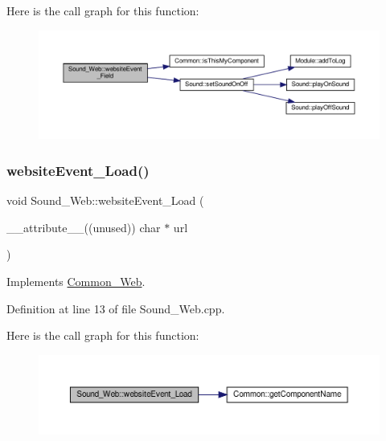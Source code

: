 Here is the call graph for this function\+:
\nopagebreak
\begin{figure}[H]
\begin{center}
\leavevmode
\includegraphics[width=350pt]{class_sound___web_a3f9b60318e13f510c7ed49cc52962424_cgraph}
\end{center}
\end{figure}
\mbox{\label{class_sound___web_ae3a500bbde7e1264aeeb1bf43b5ba09f}} 
\subsubsection{\texorpdfstring{website\+Event\+\_\+\+Load()}{websiteEvent\_Load()}}
{\footnotesize\ttfamily void Sound\+\_\+\+Web\+::website\+Event\+\_\+\+Load (\begin{DoxyParamCaption}\item[{\+\_\+\+\_\+attribute\+\_\+\+\_\+((unused)) char $\ast$}]{url }\end{DoxyParamCaption})\hspace{0.3cm}{\ttfamily [virtual]}}



Implements \hyperlink{class_common___web_a5ce0d5ce6f63279c3b624371d8a76211}{Common\+\_\+\+Web}.



Definition at line 13 of file Sound\+\_\+\+Web.\+cpp.

Here is the call graph for this function\+:
\nopagebreak
\begin{figure}[H]
\begin{center}
\leavevmode
\includegraphics[width=350pt]{class_sound___web_ae3a500bbde7e1264aeeb1bf43b5ba09f_cgraph}
\end{center}
\end{figure}
\mbox{\label{class_sound___web_a4b2c5db998fe35455bd3e82ae021d81b}} 
